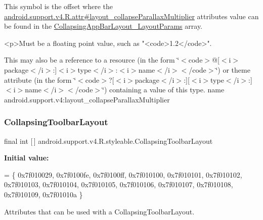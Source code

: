 This symbol is the offset where the \hyperlink{classandroid_1_1support_1_1v4_1_1R_1_1attr_a580876bd2ce4e2bd2d19c57ed9f91af1}{android.\+support.\+v4.\+R.\+attr\#layout\+\_\+collapse\+Parallax\+Multiplier} attribute\textquotesingle{}s value can be found in the \hyperlink{classandroid_1_1support_1_1v4_1_1R_1_1styleable_a0696d62845b5e876d66afb6909f133af}{Collapsing\+App\+Bar\+Layout\+\_\+\+Layout\+Params} array.

\begin{DoxyVerb}      <p>Must be a floating point value, such as "<code>1.2</code>".
\end{DoxyVerb}
 

This may also be a reference to a resource (in the form \char`\"{}$<$code$>$@\mbox{[}$<$i$>$package$<$/i$>$\+:\mbox{]}$<$i$>$type$<$/i$>$\+:$<$i$>$name$<$/i$>$$<$/code$>$\char`\"{}) or theme attribute (in the form \char`\"{}$<$code$>$?\mbox{[}$<$i$>$package$<$/i$>$\+:\mbox{]}\mbox{[}$<$i$>$type$<$/i$>$\+:\mbox{]}$<$i$>$name$<$/i$>$$<$/code$>$\char`\"{}) containing a value of this type.  name android.\+support.\+v4\+:layout\+\_\+collapse\+Parallax\+Multiplier \mbox{\label{classandroid_1_1support_1_1v4_1_1R_1_1styleable_a91b20e27088c910353d38c1efde32aa9}} 
\subsubsection{\texorpdfstring{Collapsing\+Toolbar\+Layout}{CollapsingToolbarLayout}}
{\footnotesize\ttfamily final int \mbox{[}$\,$\mbox{]} android.\+support.\+v4.\+R.\+styleable.\+Collapsing\+Toolbar\+Layout\hspace{0.3cm}{\ttfamily [static]}}

{\bfseries Initial value\+:}
\begin{DoxyCode}
= \{
            0x7f010029, 0x7f0100fe, 0x7f0100ff, 0x7f010100,
            0x7f010101, 0x7f010102, 0x7f010103, 0x7f010104,
            0x7f010105, 0x7f010106, 0x7f010107, 0x7f010108,
            0x7f010109, 0x7f01010a
        \}
\end{DoxyCode}
Attributes that can be used with a Collapsing\+Toolbar\+Layout. 


